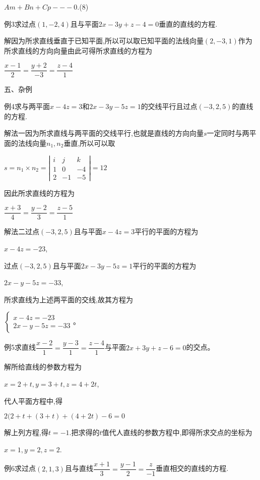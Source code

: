 \documentclass[oneside]{book}
\begin{document}
$Am + Bn + Cp---0$.(8)

例3求过点$(1,-2,4)$且与平面$2x - 3y + z - 4 = 0$垂直的直线的方程.

解因为所求直线垂直于已知平面,所以可以取已知平面的法线向量$(2,-3,1)$作为所求直线的方向向量由此可得所求直线的方程为

$\dfrac{{x - 1}}{2} = \dfrac{{y + 2}}{{ - 3}} = \dfrac{{z - 4}}{1}$

五、杂例

例4求与两平面$x - 4z = 3$和$2x - 3y - 5z = 1$的交线平行且过点$(-3,2,5)$的直线的方程.

解法一因为所求直线与两平面的交线平行,也就是直线的方向向量$s$一定同时与两平面的法线向量${n_1},{n_2}$垂直,所以可以取

$s=n_{1} \times n_{2}=\left|\begin{array}{ccc}{i} & {j} & {k} \\ {1} & {0} & {-4} \\ {2} & {-1} & {-5}\end{array}\right|=12$

因此所求直线的方程为

$\dfrac{{x + 3}}{4} = \dfrac{{y - 2}}{3} = \dfrac{{z - 5}}{1}$

解法二过点$(-3,2,5)$且与平面$x - 4z = 3$平行的平面的方程为

$x - 4z =  - 23$,

过点$(-3,2,5)$且与平面$2x - 3y - 5z = 1$平行的平面的方程为

$2x - y - 5z =  - 33$,

所求直线为上述两平面的交线,故其方程为

$\left\{\begin{array}{l}{x-4 z=-23} \\ {2 x-y-5 z=-33}\end{array}\right.$。

例5求直线$\dfrac{{x - 2}}{1} = \dfrac{{y - 3}}{1} = \dfrac{{z - 4}}{1}$与平面$2x + 3y + z - 6 = 0$的交点。

解所给直线的参数方程为

$x = 2 + t,y = 3 + t,z = 4 + 2t$,

代人平面方程中,得

$2(2 + t + \left( {3 + t} \right) + (4 + 2t) - 6 = 0$

解上列方程,得$t=-1$.把求得的$t$值代人直线的参数方程中,即得所求交点的坐标为

$x = 1,y = 2,z = 2$.

例6求过点$(2,1,3)$且与直线$\dfrac{{x + 1}}{3} = \dfrac{{y - 1}}{2} = \dfrac{z}{{ - 1}}$垂直相交的直线的方程.
\end{document}
